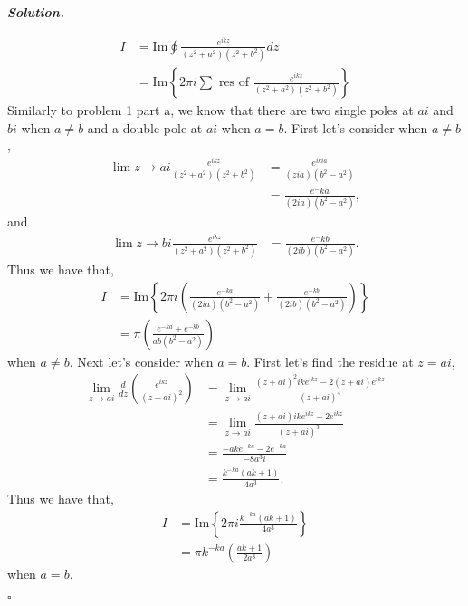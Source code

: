\documentclass[12pt]{report}
\newenvironment{solution}[1][\it{Solution}]{\textbf{#1. } }{$\square$}
\begin{document}
\begin{solution}
\begin{enumerate}
        \begin{align*}
            I &= \mathrm{Im} \oint \frac{e^{ikz}}{(z^2 + a^2)(z^2 + b^2)}dz\\
            &= \mathrm{Im} \left\{ 2\pi i \sum \text{ res of } \frac{e^{ikz}}{(z^2 + a^2)(z^2 + b^2)}\right\}
        \end{align*}
        Similarly to problem 1 part a, we know that there are two single poles at $ai$ and $bi$ when $a\neq b$ and a double pole at $ai$ when $a=b$. First let's consider when $a\neq b$,
        \begin{align*}
            \lim{z \rightarrow ai} \frac{e^{ikz}}{(z^2 + a^2)(z^2 + b^2)} &= \frac{e^{ikia}}{(zia)(b^2 - a^2)}\\
            &= \frac{e^-ka}{(2ia)(b^2 - a^2)},
        \end{align*}
        and
        \begin{align*}
            \lim{z \rightarrow bi} \frac{e^{ikz}}{(z^2 + a^2)(z^2 + b^2)}
            &= \frac{e^-kb}{(2ib)(b^2 - a^2)}.
        \end{align*}
        Thus we have that,
        \begin{align*}
            I &= \mathrm{Im} \left\{ 2\pi i \left( \frac{e^{-ka}}{(2ia)(b^2 - a^2)} + \frac{e^{-kb}}{(2ib)(b^2 - a^2)} \right)\right\}\\
            &= \pi \left( \frac{e^{-ka} + e^{-kb}}{ab(b^2 - a^2)}\right)
        \end{align*}
        when $a \neq b$. 
        Next let's consider when $a=b$. First let's find the residue at $z=ai$,
        \begin{align*}
            \lim_{z \rightarrow ai} \frac{d}{dz} \left( \frac{e^{ikz}}{(z + ai)^2} \right) &= \lim_{z \rightarrow ai} \frac{(z + ai)^2ike^{ikz} - 2(z + ai)e^{ikz}}{(z+ai)^4}\\
            &= \lim_{z \rightarrow ai} \frac{(z + ai)ike^{ikz} - 2e^{ikz}}{(z+ai)^3}\\
            &= \frac{-ake^{-ka} - 2e^{-ka}}{-8a^3i}\\
            &= \frac{k^{-ka}(ak + 1)}{4a^3}.
        \end{align*}
        Thus we have that,
        \begin{align*}
            I &= \mathrm{Im} \left\{ 2\pi i \frac{k^{-ka}(ak + 1)}{4a^3}\right\}\\
            &= \pi k^{-ka}\left( \frac{ak + 1}{2a^3}\right)
        \end{align*}
        when $a=b$.


\end{enumerate}
\end{solution}
\end{document}
